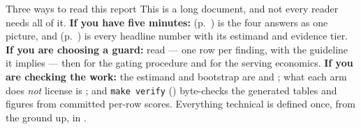 \documentclass[11pt]{article}
\newcommand{\code}[1]{\texttt{\small #1}}
\begin{document}
\begin{background}{Three ways to read this report}
This is a long document, and not every reader needs all of it.
\textbf{If you have five minutes:}  (p.~\pageref{fig:teaser}) is the four answers as
one picture, and  (p.~\pageref{tab:glance}) is every headline number with its
estimand and evidence tier.
\textbf{If you are choosing a guard:} read  --- one row per finding, with the
guideline it implies --- then  for the gating procedure and
 for the serving economics.
\textbf{If you are checking the work:} the estimand and bootstrap are  and
; what each arm does \emph{not} license is ; and \code{make verify}
() byte-checks the generated tables and figures from committed per-row scores.
Everything technical is defined once, from the ground up, in .
\end{background}
\end{document}
